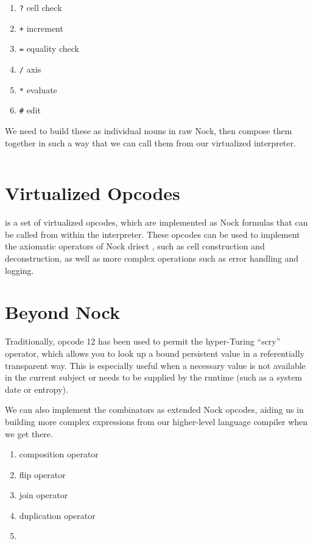 \begin{enumerate}
  \item  \lstinline[style=inlinecode]{?} cell check
  \item  \lstinline[style=inlinecode]{+} increment
  \item  \lstinline[style=inlinecode]{=} equality check
  \item  \lstinline[style=inlinecode]{/} axis
  \item  \lstinline[style=inlinecode]{*} evaluate
  \item  \lstinline[style=inlinecode]{#} edit
\end{enumerate}

\noindent
We need to build these as individual nouns in raw Nock, then compose them together in such a way that we can call them from our virtualized interpreter.

\begin{lstlisting}[style=listingcomb]
\end{lstlisting}

\section{Virtualized Opcodes}

is a set of virtualized opcodes, which are implemented as Nock formulas that can be called from within the interpreter.  These opcodes can be used to implement the axiomatic operators of Nock driect
, such as cell construction and deconstruction, as well as more complex operations such as error handling and logging.


\section{Beyond Nock}

Traditionally, opcode 12 has been used to permit the hyper-Turing ``scry'' operator, which allows you to look up a bound persistent value in a referentially transparent way.  This is especially useful when a necessary value is not available in the current subject or needs to be supplied by the runtime (such as a system date or entropy).

We can also implement the combinators as extended Nock opcodes, aiding us in building more complex expressions from our higher-level language compiler when we get there.

\begin{enumerate}
  \item[13.]   composition operator
  \item[14.]   flip operator
  \item[15.]   join operator
  \item[16.]   duplication operator
  \item[17.]  
\end{enumerate}

